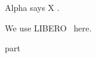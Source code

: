 \documentclass{article}
\let\pc\cite
\newcommand{\libero}{LIBERO~\cite{ka}}
\begin{document}
Alpha says X \pc{ka}.

We use \libero{} here.

{part}
\nocite{kb}


\end{document}
